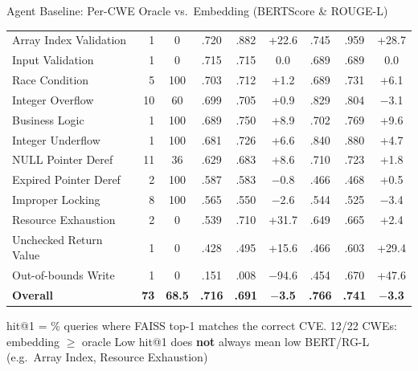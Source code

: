 \documentclass[aspectratio=169,10pt]{beamer}
\newcommand{\chit}[1]{\cellcolor{hit!30} #1}
\newcommand{\cmiss}[1]{\cellcolor{miss!25} #1}
\newcommand{\cwarn}[1]{\cellcolor{warn!30} #1}
\begin{document}
\begin{frame}{Agent Baseline: Per-CWE Oracle vs.\ Embedding (BERTScore \& ROUGE-L)}
{\begin{tabular}{l r c c c c c c c}
    Array Index Validation            & 1  & \cmiss{0}   & .720 & .882 & \chit{+22.6}  & .745 & .959 & \chit{+28.7} \\
    Input Validation                  & 1  & \cmiss{0}   & .715 & .715 & 0.0            & .689 & .689 & 0.0 \\
    Race Condition                    & 5  & \chit{100}  & .703 & .712 & \chit{+1.2}   & .689 & .731 & \chit{+6.1} \\
    Integer Overflow                  & 10 & \cwarn{60}  & .699 & .705 & \chit{+0.9}   & .829 & .804 & $-$3.1 \\
    Business Logic                    & 1  & \chit{100}  & .689 & .750 & \chit{+8.9}   & .702 & .769 & \chit{+9.6} \\
    Integer Underflow                 & 1  & \chit{100}  & .681 & .726 & \chit{+6.6}   & .840 & .880 & \chit{+4.7} \\
    \midrule
    NULL Pointer Deref                & 11 & \cmiss{36}  & .629 & .683 & \chit{+8.6}   & .710 & .723 & +1.8 \\
    Expired Pointer Deref             & 2  & \chit{100}  & .587 & .583 & $-$0.8         & .466 & .468 & +0.5 \\
    Improper Locking                  & 8  & \chit{100}  & .565 & .550 & $-$2.6         & .544 & .525 & $-$3.4 \\
    Resource Exhaustion               & 2  & \cmiss{0}   & .539 & .710 & \chit{+31.7}  & .649 & .665 & \chit{+2.4} \\
    Unchecked Return Value            & 1  & \cmiss{0}   & .428 & .495 & \chit{+15.6}  & .466 & .603 & \chit{+29.4} \\
    Out-of-bounds Write               & 1  & \cmiss{0}   & .151 & .008 & \cmiss{$-$94.6}& .454 & .670 & \chit{+47.6} \\
    \midrule
    \rowcolor{c1!8}
    \textbf{Overall}                  & \textbf{73} & \textbf{68.5}
                                      & \textbf{.716} & \textbf{.691} & \textbf{$-$3.5}
                                      & \textbf{.766} & \textbf{.741} & \textbf{$-$3.3} \\
    \bottomrule
  \end{tabular}}

  \vspace{0.3em}
  {\scriptsize
  \textcolor{c1}{} hit@1 = \% queries where FAISS top-1 matches the correct CVE.
  \textcolor{hit}{} 12/22 CWEs: embedding $\ge$ oracle \quad
  \textcolor{miss}{} Low hit@1 does \textbf{not} always mean low BERT/RG-L (e.g.\ Array Index, Resource Exhaustion)}

\end{frame}
\end{document}
